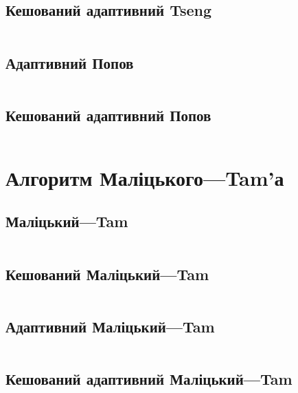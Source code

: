 \newpage\subsection{Кешований адаптивний Tseng}
\inputminted[linenos,firstline=55,lastline=102,fontsize=\tiny]{python}{src/adaptive/tseng.py}

\newpage\subsection{Адаптивний Попов}
\inputminted[linenos,firstline=09,lastline=54,fontsize=\tiny]{python}{src/adaptive/popov.py}

\newpage\subsection{Кешований адаптивний Попов}
\inputminted[linenos,firstline=57,lastline=105,fontsize=\tiny]{python}{src/adaptive/popov.py}

\section{Алгоритм Маліцького---Tam'а}

\subsection{Маліцький---Tam}
\inputminted[linenos,firstline=09,lastline=38,fontsize=\tiny]{python}{src/core/malitskyi_tam.py}

\newpage\subsection{Кешований Маліцький---Tam}
\inputminted[linenos,firstline=41,lastline=74,fontsize=\tiny]{python}{src/core/malitskyi_tam.py}

\newpage\subsection{Адаптивний Маліцький---Tam}
\inputminted[linenos,firstline=09,lastline=52,fontsize=\tiny]{python}{src/adaptive/malitskyi_tam.py}

\newpage\subsection{Кешований адаптивний Маліцький---Tam}
\inputminted[linenos,firstline=55,lastline=103,fontsize=\tiny]{python}{src/adaptive/malitskyi_tam.py}

